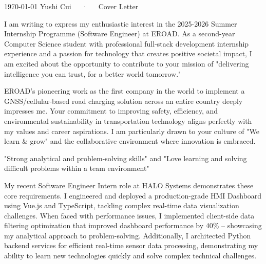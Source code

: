 \documentclass[11pt, a4paper]{awesome-cv}
\begin{document}
\makecvheader[C]

\makecvfooter
  {\today}
  {Yushi Cui~~~·~~~Cover Letter}
  {}

\makelettertitle

\begin{cvletter}

I am writing to express my enthusiastic interest in the 2025-2026 Summer Internship Programme (Software Engineer) at EROAD. As a second-year Computer Science student with professional full-stack development internship experience and a passion for technology that creates positive societal impact, I am excited about the opportunity to contribute to your mission of "delivering intelligence you can trust, for a better world tomorrow."

EROAD's pioneering work as the first company in the world to implement a GNSS/cellular-based road charging solution across an entire country deeply impresses me. Your commitment to improving safety, efficiency, and environmental sustainability in transportation technology aligns perfectly with my values and career aspirations. I am particularly drawn to your culture of "We learn \& grow" and the collaborative environment where innovation is embraced.

"Strong analytical and problem-solving skills" and "Love learning and solving difficult problems within a team environment"

My recent Software Engineer Intern role at HALO Systems demonstrates these core requirements. I engineered and deployed a production-grade HMI Dashboard using Vue.js and TypeScript, tackling complex real-time data visualization challenges. When faced with performance issues, I implemented client-side data filtering optimization that improved dashboard performance by 40\% -- showcasing my analytical approach to problem-solving. Additionally, I architected Python backend services for efficient real-time sensor data processing, demonstrating my ability to learn new technologies quickly and solve complex technical challenges.


\end{cvletter}
\end{document}
